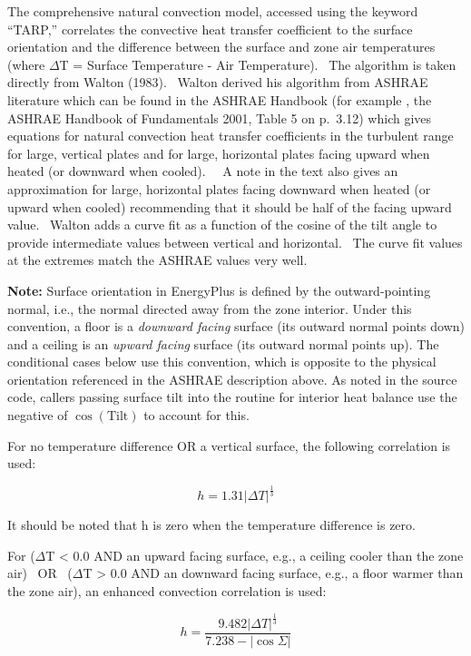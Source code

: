 The comprehensive natural convection model, accessed using the keyword ``TARP,'' correlates the convective heat transfer coefficient to the surface orientation and the difference between the surface and zone air temperatures (where $\Delta$T = Surface Temperature - Air Temperature).~ The algorithm is taken directly from Walton (1983).~ Walton derived his algorithm from ASHRAE literature which can be found in the ASHRAE Handbook (for example , the  ASHRAE Handbook of Fundamentals 2001, Table 5 on p.~3.12) which gives equations for natural convection heat transfer coefficients in the turbulent range for large, vertical plates and for large, horizontal plates facing upward when heated (or downward when cooled).~~ A note in the text also gives an approximation for large, horizontal plates facing downward when heated (or upward when cooled) recommending that it should be half of the facing upward value.~ Walton adds a curve fit as a function of the cosine of the tilt angle to provide intermediate values between vertical and horizontal.~ The curve fit values at the extremes match the ASHRAE values very well.

\textbf{Note:} Surface orientation in EnergyPlus is defined by the outward-pointing normal, i.e., the normal directed away from the zone interior. Under this convention, a floor is a \emph{downward facing} surface (its outward normal points down) and a ceiling is an \emph{upward facing} surface (its outward normal points up). The conditional cases below use this convention, which is opposite to the physical orientation referenced in the ASHRAE description above. As noted in the source code, callers passing surface tilt into the routine for interior heat balance use the negative of $\cos(\text{Tilt})$ to account for this.

For no temperature difference OR a vertical surface, the following correlation is used:

\begin{equation}
h = 1.31{\left| {\Delta T} \right|^{\frac{1}{3}}}
\end{equation}

It should be noted that h is zero when the temperature difference is zero.

For ($\Delta$T \textless{} 0.0 AND an upward facing surface, e.g., a ceiling cooler than the zone air)~ OR~ ($\Delta$T \textgreater{} 0.0 AND an downward facing surface, e.g., a floor warmer than the zone air), an enhanced convection correlation is used:

\begin{equation}
h = \frac{{9.482{{\left| {\Delta T} \right|}^{\frac{1}{3}}}}}{{7.238 - \left| {\cos \Sigma } \right|}}
\end{equation}

